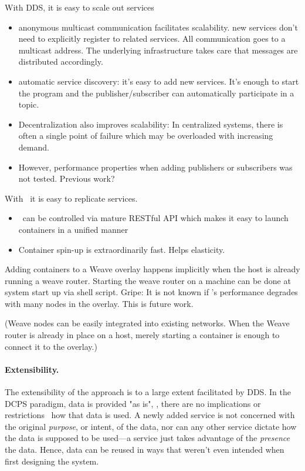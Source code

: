 With DDS, it is easy to scale out services
\begin{itemize}
\item anonymous multicast communication facilitates scalability. new services don't need to explicitly register to related services. All communication goes to a multicast address. The underlying infrastructure takes care that messages are distributed accordingly.
\item automatic service discovery: it's easy to add new services. It's enough to start the program and the publisher/subscriber can automatically participate in a topic.
\item Decentralization also improves scalability: In centralized systems, there is often a single point of failure which may be overloaded with increasing demand. 
\item However, performance properties when adding publishers or subscribers was not tested. Previous work?
\end{itemize}

With \docker\ it is easy to replicate services. 
\begin{itemize}
\item \docker\ can be controlled via mature RESTful API which makes it easy to launch containers in a unified manner
\item Container spin-up is extraordinarily fast. Helps elasticity.
\end{itemize}

Adding containers to a Weave overlay happens implicitly when the host is already running a weave router. Starting the weave router on a machine can be done at system start up via shell script. Gripe: It is not known if \weave 's performance degrades with many nodes in the overlay. This is future work.

(Weave nodes can be easily integrated into existing networks. When the Weave router is already in place on a host, merely starting a container is enough to connect it to the overlay.)

\paragraph{Extensibility.}
The extensibility of the approach is to a large extent facilitated by DDS. In the DCPS paradigm, data is provided "as is", \ie , there are no implications or restrictions \wrt\ how that data is used. A newly added service is not concerned with the original \emph{purpose}, or intent, of the data, nor can any other service dictate how the data is supposed to be used---a service just takes advantage of the \emph{presence} the data. Hence, data can be reused in ways that weren't even intended when first designing the system.


